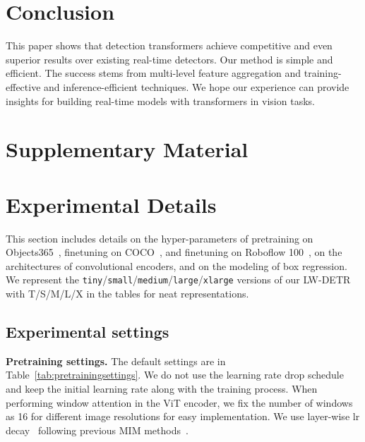 \documentclass[runningheads]{llncs}
\begin{document}
\section{Conclusion}
This paper shows that detection transformers 
achieve competitive 
and even
superior results over existing real-time detectors. Our method is simple and efficient. The success stems from
multi-level feature aggregation
and training-effective and inference-efficient techniques. 
We hope our experience can provide insights for building real-time models with transformers in vision tasks.





\clearpage

\renewcommand{\thesection}{\Alph{section}}
\setcounter{section}{0}
\section*{Supplementary Material}
\section{Experimental Details}
This section includes details on the hyper-parameters of pretraining on Objects365~\cite{shao2019objects365}, finetuning on COCO~\cite{lin2014microsoft}, and finetuning on Roboflow 100~\cite{ciaglia2022roboflow}, on the architectures of convolutional encoders, and on the modeling of box regression. We represent the \texttt{tiny}/\texttt{small}/\texttt{medium}/\texttt{large}/\texttt{xlarge} versions of our LW-DETR with T/S/M/L/X in the tables for neat representations.

\subsection{Experimental settings}
\noindent\textbf{Pretraining settings.} The default settings are in Table~\ref{tab:pretrainingsettings}. We do not use the learning rate drop schedule and keep the initial learning rate along with the training process. When performing window attention in the ViT encoder, we fix the number of windows as 16 for different image resolutions for easy implementation. We use layer-wise lr decay~\cite{clark2020electra} following previous MIM methods~\cite{he2022masked,chen2022context,zhang2023cae}.
\end{document}
